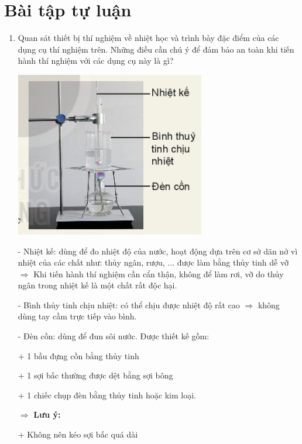 \section{Bài tập tự luận}
\setcounter{section}{0}

\begin{enumerate}[label=\bfseries Câu \arabic*:]
	\item {}
	
	
	{ 
		
		Quan sát thiết bị thí nghiệm về nhiệt học và trình bày đặc điểm của các dụng cụ thí nghiệm trên. Những điều cần chú ý để đảm bảo an toàn khi tiến hành thí nghiệm với các dụng cụ này là gì?
		\begin{center}
			\includegraphics[scale=0.6]{../figs/VN10-2022-PH-TP003-3.jpg}
		\end{center}
	}
	
	\hideall
	{
		- Nhiệt kế: dùng để đo nhiệt độ của nước, hoạt động dựa trên cơ sở dãn nở vì nhiệt của các chất như: thủy ngân, rượu, ... được làm bằng thủy tinh dễ vỡ $\Rightarrow$ Khi tiến hành thí nghiệm cần cẩn thận, không để làm rơi, vỡ do thủy ngân trong nhiệt kế là một chất rất độc hại.
		
		- Bình thủy tinh chịu nhiệt: có thể chịu được nhiệt độ rất cao $\Rightarrow$ không dùng tay cầm trực tiếp vào bình.
		
		- Đèn cồn: dùng để đun sôi nước. Được thiết kế gồm:
		
		+ 1 bầu đựng cồn bằng thủy tinh
		
		+ 1 sợi bấc thường được dệt bằng sợi bông
		
		+ 1 chiếc chụp đèn bằng thủy tinh hoặc kim loại.
		
		$\Rightarrow$ \textbf{Lưu ý:}
		
		+ Không nên kéo sợi bấc quá dài
		
}
\end{enumerate}
